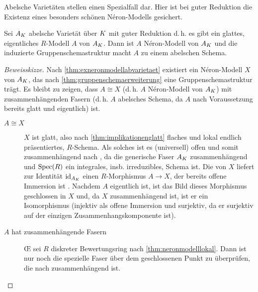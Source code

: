 \documentclass[german]{scrreprt}
\begin{document}
Abelsche Varietäten stellen einen Spezialfall dar. Hier ist bei guter
Reduktion die Existenz eines besonders schönen Néron-Modells gesichert.
\begin{Satz}\label{thm:abelscheneronmodelle}
  Sei $A_{K}$ abelsche Varietät über $K$ mit guter Reduktion
  d.\,h. es gibt ein glattes, eigentliches $R$-Modell $A$ von $A_{K}$.
  Dann ist $A$ Néron-Modell von $A_{K}$ und die induzierte
  Gruppenschemastruktur macht $A$ zu einem abelschen Schema.
  \cite[1.4, Proposition 2]{neron}
  \begin{proof}[Beweisskizze]
    Nach \autoref{thm:exneronmodellabvarietaet} existiert ein
    Néron-Modell $X$ von $A_{K}$, das nach
    \autoref{thm:gruppenschemaerweiterung} eine Gruppenschemastruktur
    trägt.
    Es bleibt zu zeigen, dass $A\cong X$ (d.\,h. $A$ Néron-Modell von
    $A_{K}$) mit zusammenhängenden Fasern (d.\,h. $A$ abelsches Schema,
    da $A$ nach Voraussetzung bereits glatt und eigentlich) ist.
    \begin{description}
    \item[$A\cong X$] $X$ ist glatt, also nach
      \autoref{thm:implikationenglatt} flaches und lokal endlich
      präsentiertes, $R$-Schema.
      Als solches ist es (universell) offen \cite[Theorem 14.33]{wedhorn}
      und somit zusammenhängend nach \cite[Proposition 3.24]{wedhorn},
      da die generische Faser $A_{K}$ zusammenhängend und $\operatorname{Spec}(R)$
      ein integrales, insb. irreduzibles, Schema ist.
      Die \NAbbEig von $X$ liefert zur Identität $\mathrm{id}_{A_{K}}$ einen
      $R$-Morphismus $A\to X$, der bereits offene Immersion ist
      \cite[4.3/1 (ii) oder 4.4/1]{neron}.
      Nachdem $A$ eigentlich ist, ist das Bild dieses Morphismus
      geschlossen in $X$ und, da $X$ zusammenhängend ist, ist er ein
      Isomorphismus (injektiv als offene Immersion und surjektiv, da
      er surjektiv auf der einzigen Zusammenhangskomponente ist).
    \item[$A$ hat zusammenhängende Fasern]
      \OE{} sei $R$ diskreter Bewertungsring nach
      \autoref{thm:neronmodelllokal}.
      Dann ist nur noch die spezielle Faser über dem geschlossenen
      Punkt zu überprüfen, die nach \cite[5.5.1]{EGAIII-1} zusammenhängend
      ist.
    \end{description}
  \end{proof}
\end{Satz}
\end{document}
